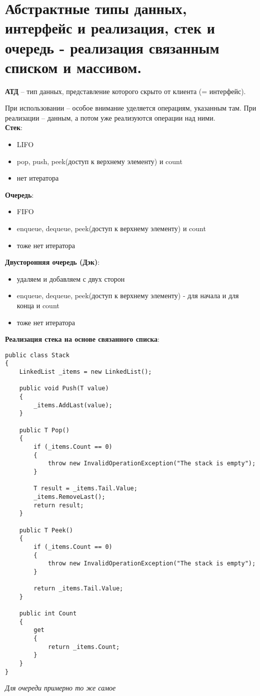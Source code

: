 \section {Абстрактные типы данных, интерфейс и реализация, стек и очередь - реализация связанным списком и массивом.}

\noindent\textbf{АТД} \--- тип данных, представление которого скрыто от клиента (= интерфейс).

При использовании \--- особое внимание уделяется операциям, указанным там. При реализации \--- данным, а потом уже реализуются операции над ними. \\

\noindent\textbf{Стек}:
\begin{itemize}
\item LIFO
\item pop, push, peek(доступ к верхнему элементу) и count
\item нет итератора


\end{itemize}

\noindent\textbf{Очередь}:
\begin{itemize}
\item FIFO
\item enqueue, dequeue, peek(доступ к верхнему элементу) и count
\item тоже нет итератора
\end{itemize}

\noindent\textbf{Двусторонняя очередь (Дэк)}:
\begin{itemize}
\item удаляем и добавляем с двух сторон
\item enqueue, dequeue, peek(доступ к верхнему элементу) - для начала и для конца и count
\item тоже нет итератора
\end{itemize}


\noindent\textbf{Реализация стека на основе связанного списка}:
\begin{verbatim}
public class Stack
{
    LinkedList _items = new LinkedList();

    public void Push(T value)
    {
        _items.AddLast(value);
    }

    public T Pop()
    {
        if (_items.Count == 0)
        {
            throw new InvalidOperationException("The stack is empty");
        }

    	T result = _items.Tail.Value;
    	_items.RemoveLast();
    	return result;
    }

    public T Peek()
    {
        if (_items.Count == 0)
        {
            throw new InvalidOperationException("The stack is empty");
        }

    	return _items.Tail.Value;
    }

    public int Count
    {
        get
        {
            return _items.Count;
        }
    }
}
\end{verbatim}
\noindent\textit{Для очереди примерно то же самое}


